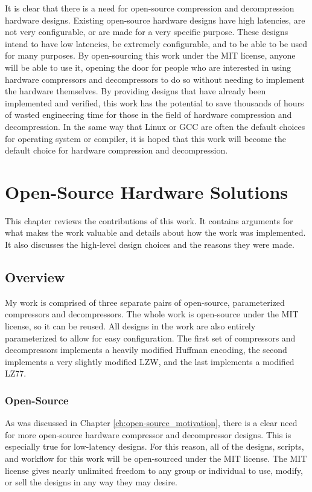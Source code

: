 \documentclass[doublespace,nopageskip]{VTthesis}
\begin{document}
It is clear that there is a need for open-source compression and decompression hardware designs. Existing open-source hardware designs have high latencies, are not very configurable, or are made for a very specific purpose. These designs intend to have low latencies, be extremely configurable, and to be able to be used for many purposes. By open-sourcing this work under the MIT license, anyone will be able to  use it, opening the door for people who are interested in using hardware compressors and decompressors to do so without needing to implement the hardware themselves. By providing designs that have already been implemented and verified, this work has the potential to save thousands of hours of wasted engineering time for those in the field of hardware compression and decompression. In the same way that Linux or GCC are often the default choices for operating system or compiler, it is hoped that this work will become the default choice for hardware compression and decompression.

\chapter{Open-Source Hardware Solutions} \label{ch:open-source_hardware_solutions}
This chapter reviews the contributions of this work. It contains arguments for what makes the work valuable and details about how the work was implemented. It also discusses the high-level design choices and the reasons they were made.

\section{Overview}\label{se:overview}
My work is comprised of three separate pairs of open-source, parameterized compressors and decompressors. The whole work is open-source under the MIT license, so it can be reused. All designs in the work are also entirely parameterized to allow for easy configuration. The first set of compressors and decompressors implements a heavily modified Huffman encoding, the second implements a very slightly modified LZW, and the last implements a modified LZ77.

\subsection{Open-Source}\label{ss:open-source}
As was discussed in Chapter \ref{ch:open-source_motivation}, there is a clear need for more open-source hardware compressor and decompressor designs. This is especially true for low-latency designs. For this reason, all of the designs, scripts, and workflow for this work will be open-sourced under the MIT license. The MIT license gives nearly unlimited freedom to any group or individual to use, modify, or sell the designs in any way they may desire.
\end{document}
